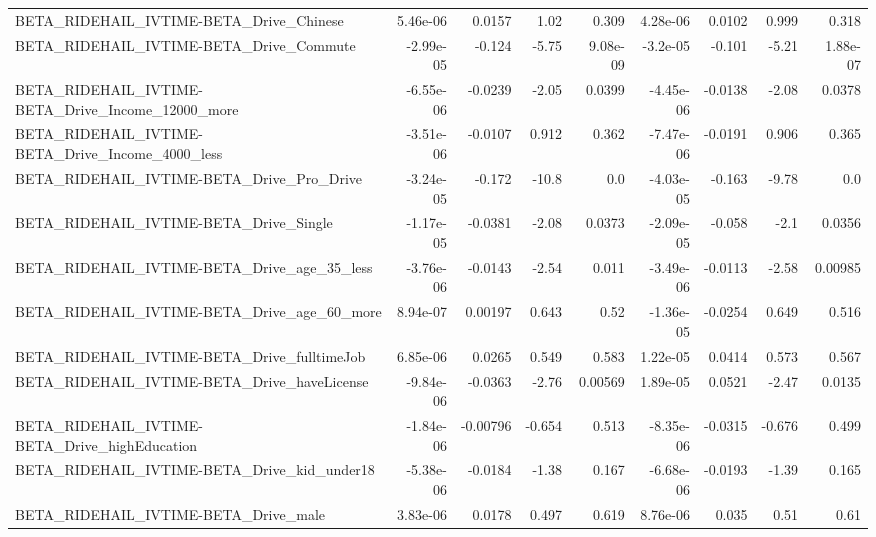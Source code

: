 \begin{tabular}{lrrrrrrrr}
BETA\_RIDEHAIL\_IVTIME-BETA\_Drive\_Chinese            &    5.46e-06 &       0.0157 &      1.02 &    0.309 &   4.28e-06 &      0.0102 &        0.999 &         0.318 \\
BETA\_RIDEHAIL\_IVTIME-BETA\_Drive\_Commute            &   -2.99e-05 &       -0.124 &     -5.75 & 9.08e-09 &   -3.2e-05 &      -0.101 &        -5.21 &      1.88e-07 \\
BETA\_RIDEHAIL\_IVTIME-BETA\_Drive\_Income\_12000\_more  &   -6.55e-06 &      -0.0239 &     -2.05 &   0.0399 &  -4.45e-06 &     -0.0138 &        -2.08 &        0.0378 \\
BETA\_RIDEHAIL\_IVTIME-BETA\_Drive\_Income\_4000\_less   &   -3.51e-06 &      -0.0107 &     0.912 &    0.362 &  -7.47e-06 &     -0.0191 &        0.906 &         0.365 \\
BETA\_RIDEHAIL\_IVTIME-BETA\_Drive\_Pro\_Drive          &   -3.24e-05 &       -0.172 &     -10.8 &      0.0 &  -4.03e-05 &      -0.163 &        -9.78 &           0.0 \\
BETA\_RIDEHAIL\_IVTIME-BETA\_Drive\_Single             &   -1.17e-05 &      -0.0381 &     -2.08 &   0.0373 &  -2.09e-05 &      -0.058 &         -2.1 &        0.0356 \\
BETA\_RIDEHAIL\_IVTIME-BETA\_Drive\_age\_35\_less        &   -3.76e-06 &      -0.0143 &     -2.54 &    0.011 &  -3.49e-06 &     -0.0113 &        -2.58 &       0.00985 \\
BETA\_RIDEHAIL\_IVTIME-BETA\_Drive\_age\_60\_more        &    8.94e-07 &      0.00197 &     0.643 &     0.52 &  -1.36e-05 &     -0.0254 &        0.649 &         0.516 \\
BETA\_RIDEHAIL\_IVTIME-BETA\_Drive\_fulltimeJob        &    6.85e-06 &       0.0265 &     0.549 &    0.583 &   1.22e-05 &      0.0414 &        0.573 &         0.567 \\
BETA\_RIDEHAIL\_IVTIME-BETA\_Drive\_haveLicense        &   -9.84e-06 &      -0.0363 &     -2.76 &  0.00569 &   1.89e-05 &      0.0521 &        -2.47 &        0.0135 \\
BETA\_RIDEHAIL\_IVTIME-BETA\_Drive\_highEducation      &   -1.84e-06 &     -0.00796 &    -0.654 &    0.513 &  -8.35e-06 &     -0.0315 &       -0.676 &         0.499 \\
BETA\_RIDEHAIL\_IVTIME-BETA\_Drive\_kid\_under18        &   -5.38e-06 &      -0.0184 &     -1.38 &    0.167 &  -6.68e-06 &     -0.0193 &        -1.39 &         0.165 \\
BETA\_RIDEHAIL\_IVTIME-BETA\_Drive\_male               &    3.83e-06 &       0.0178 &     0.497 &    0.619 &   8.76e-06 &       0.035 &         0.51 &          0.61 \\

\end{tabular}

